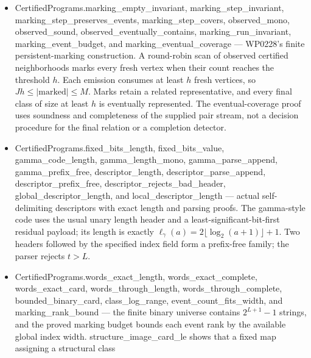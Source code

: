 \documentclass[11pt,a4paper]{article}
\newcommand{\lean}[1]{{\ttfamily\small
  \let\leanunderscore\_\def\_{\leanunderscore\allowbreak}#1}}
\begin{document}
\begin{itemize}[leftmargin=1.4em,itemsep=1pt]
on finding compression bound the substrate every such model needs. The bound is a named hypothesis
(classical, Li--Vit\'anyi); the log-loss identity is proved outright, and is the precise sense in
which prediction and compression coincide --- \emph{sequential probabilistic} compression, not
compression in general.
\begingroup\raggedright
\item \lean{CertifiedPrograms.marking\_empty\_invariant},
\lean{marking\_step\_invariant}, \lean{marking\_step\_preserves\_events},
\lean{marking\_step\_covers}, \lean{observed\_mono}, \lean{observed\_sound},
\lean{observed\_eventually\_contains}, \lean{marking\_run\_invariant},
\lean{marking\_event\_budget}, and \lean{marking\_eventual\_coverage} --- WP0228's
finite persistent-marking construction. A round-robin scan of observed certified neighborhoods
marks every fresh vertex when their count reaches the threshold $h$. Each emission consumes
at least $h$ fresh vertices, so $Jh\leq |\mathrm{marked}|\leq M$. Marks retain a related
representative, and every final class of size at least $h$ is eventually represented. The
eventual-coverage proof uses soundness and completeness of the supplied pair stream, not
a decision procedure for the final relation or a completion detector.
\item \lean{CertifiedPrograms.fixed\_bits\_length}, \lean{fixed\_bits\_value},
\lean{gamma\_code\_length}, \lean{gamma\_length\_mono}, \lean{gamma\_parse\_append},
\lean{gamma\_prefix\_free}, \lean{descriptor\_length},
\lean{descriptor\_parse\_append}, \lean{descriptor\_prefix\_free},
\lean{descriptor\_rejects\_bad\_header},
\lean{global\_descriptor\_length}, and \lean{local\_descriptor\_length} --- actual
self-delimiting descriptors with exact length and parsing proofs. The gamma-style code uses
the usual unary length header and a least-significant-bit-first residual payload; its length
is exactly $\ell_\gamma(a)=2\lfloor\log_2(a+1)\rfloor+1$. Two headers followed by the
specified index field form a prefix-free family; the parser rejects $t>L$.
\item \lean{CertifiedPrograms.words\_exact\_length}, \lean{words\_exact\_complete},
\lean{words\_exact\_card}, \lean{words\_through\_length},
\lean{words\_through\_complete}, \lean{bounded\_binary\_card},
\lean{class\_log\_range}, \lean{event\_count\_fits\_width}, and
\lean{marking\_rank\_bound} --- the finite binary universe contains $2^{L+1}-1$ strings,
and the proved marking budget bounds each event rank by the available global index width.
\lean{structure\_image\_card\_le} shows that a fixed map assigning a structural class

\end{itemize}
\end{document}

